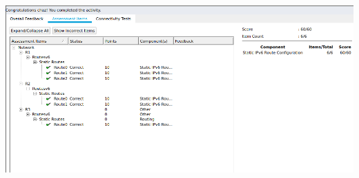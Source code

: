 \documentclass[../EngineeringJournal_CDavis.tex]{subfiles}
\begin{document}
\clearpage

\begin{center}
	\includegraphics[scale=0.25]{Figures/2020-02-05-141927_993x479_scrot.png}
\end{center}

\end{document}
